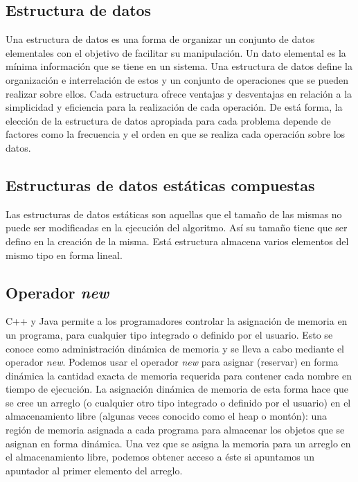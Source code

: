 \subsection{Estructura de datos}
Una estructura de datos es una forma de organizar un conjunto de datos elementales con el objetivo
de facilitar su manipulación. Un dato elemental es la mínima información que se tiene en un sistema.
Una estructura de datos define la organización e interrelación de estos y un conjunto de operaciones
que se pueden realizar sobre ellos. Cada estructura ofrece ventajas y desventajas en relación a la
simplicidad y eficiencia para la realización de cada operación. De está forma, la elección de la
estructura de datos apropiada para cada problema depende de factores como la frecuencia y el orden
en que se realiza cada operación sobre los datos.

\subsection{Estructuras de datos estáticas compuestas}
Las estructuras de datos estáticas son aquellas que el tamaño de las mismas no puede ser modificadas en la
ejecución del algoritmo. Así su tamaño tiene que ser defino en la creación de la misma. Está estructura almacena varios elementos del mismo tipo en forma lineal.

\subsection{Operador \emph{new}}
C++ y Java permite a los programadores controlar la asignación  de memoria en un programa, para cualquier tipo integrado o definido por el usuario. Esto se conoce como administración dinámica de memoria y se lleva a cabo
mediante el operador \emph{new}. Podemos usar el operador \emph{new} para asignar (reservar) en forma dinámica la cantidad exacta de memoria requerida para contener cada nombre en tiempo de ejecución. La
asignación dinámica de memoria de esta forma hace que se cree un arreglo (o cualquier otro tipo integrado o definido
por el usuario) en el almacenamiento libre (algunas veces conocido como el heap o montón): una región de memoria
asignada a cada programa para almacenar los objetos que se asignan en forma dinámica. Una vez que se asigna la memoria para un arreglo en el almacenamiento libre, podemos obtener acceso a éste si apuntamos un apuntador al primer elemento del arreglo.